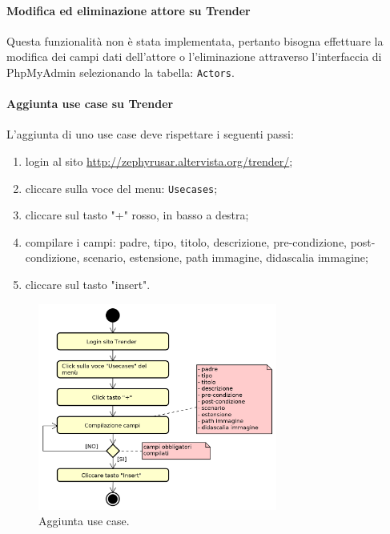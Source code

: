 	    \paragraph{Modifica ed eliminazione attore su Trender}
	    Questa funzionalità non è stata implementata, pertanto bisogna effettuare la modifica dei campi dati dell'attore o l'eliminazione attraverso l'interfaccia di PhpMyAdmin selezionando la tabella: \texttt{Actors}.
	    
	    \paragraph{Aggiunta use case su Trender}
	    L'aggiunta di uno use case deve rispettare i seguenti passi:
	    \begin{enumerate}
	    	\item login al sito \url{http://zephyrusar.altervista.org/trender/};
	    	\item cliccare sulla voce del menu: \texttt{Usecases};
	    	\item cliccare sul tasto "+" rosso, in basso a destra;
	    	\item compilare i campi: padre, tipo, titolo, descrizione, pre-condizione, post-condizione, scenario, estensione, path immagine, didascalia immagine;
	    	\item cliccare sul tasto "insert".
	    \end{enumerate}
	    \begin{figure}[H]
	    	\centering
	    	\includegraphics[width=0.7\textwidth]{img/AggiuntaUC}
	    	\caption{Aggiunta use case.}
	    \end{figure}
    

